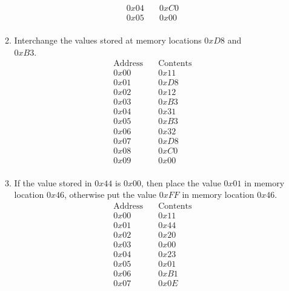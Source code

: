 \documentclass[hidelinks,12pt]{article}
\begin{document}
\begin{enumerate}
\begin{enumerate}
\begin{align*}
                    0x04 &\quad 0xC0\\
                    0x05 &\quad 0x00\\
            \end{align*}
            \item Interchange the values stored at memory locations $0xD8$ and \\$0xB3$.
                \begin{align*}
                    \text{Address}&\quad\text{Contents}\\
                    0x00 &\quad 0x11\\
                    0x01 &\quad 0xD8\\
                    0x02 &\quad 0x12\\
                    0x03 &\quad 0xB3\\
                    0x04 &\quad 0x31\\
                    0x05 &\quad 0xB3\\
                    0x06 &\quad 0x32\\
                    0x07 &\quad 0xD8\\
                    0x08 &\quad 0xC0\\
                    0x09 &\quad 0x00\\ 
                \end{align*}
            \item If the value stored in $0x44$ is $0x00$, then place the value 
                $0x01$ in memory location $0x46$, otherwise put the value $0xFF$ in memory location $0x46$.
                \begin{align*}
                    \text{Address}&\quad\text{Contents}\\
                    0x00 &\quad 0x11\\
                    0x01 &\quad 0x44\tag{Load reg. 1 with value of mem. loc. 0x44}\\
                    0x02 &\quad 0x20\\
                    0x03 &\quad 0x00\tag{Load reg. 2 with bit pattern 0x00}\\
                    0x04 &\quad 0x23\\
                    0x05 &\quad 0x01\tag{Load reg. 3 with bit pattern 0x01}\\
                    0x06 &\quad 0xB1\\
                    0x07 &\quad 0x0E\tag{Check if reg. 1 is equal to reg. 0, if true, jump to 0x0E. If false, continue.}\\

\end{align*}
\end{enumerate}
\end{enumerate}
\end{document}
